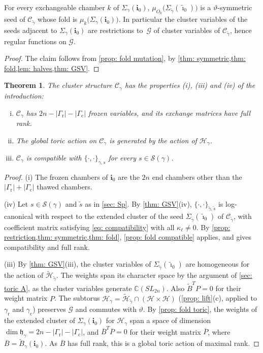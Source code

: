 \documentclass[a4paper]{amsart}
\numberwithin{equation}{section}
\newtheorem{theorem}{Theorem}[section]
\theoremstyle{definition}
\theoremstyle{remark}
\newcommand{\bbC}{\mathbb{C}}
\newcommand{\mfh}{\mathfrak{h}}
\newcommand{\mcG}{\mathcal{G}}
\newcommand{\mcH}{\mathcal{H}}
\newcommand{\mcC}{\mathcal{C}}
\newcommand{\mcS}{\mathcal{S}}
\newcommand{\bfi}{\mathbf{i}}
\newcommand{\tbfi}{\widetilde{\boldsymbol{\imath}}}
\newcommand{\tB}{\widetilde{B}}
\newcommand{\tg}{\widetilde{\gamma}}
\newcommand{\vt}{\vartheta}
\newcommand{\rr}{\mathrm{r}}
\newcommand{\cc}{\mathrm{c}}
\newcommand{\SL}{SL_{2n}}
\begin{document}
\begin{proposition}
  \label{prop: adjacent}
  For every exchangeable chamber $k$ of $\Sigma_\gamma(\bfi_0)$, $\mu_{O_k}\big(\Sigma_{\tg}(\tbfi_0)\big)$ is a $\vt$-symmetric seed of $\mcC_{\tg}$ whose fold is $\mu_k\big(\Sigma_\gamma(\bfi_0)\big)$.
  In particular the cluster variables of the seeds adjacent to $\Sigma_\gamma(\bfi_0)$ are restrictions to~$\mcG$ of cluster variables of $\mcC_{\tg}$, hence regular functions on $\mcG$.
\end{proposition}
\begin{proof}
  The claim follows from \cref{prop: fold mutation}, by \cref{thm: symmetric,thm: fold,lem: halves,thm: GSV}.
\end{proof}

\begin{theorem}
  \label{thm: structure}
  The cluster structure $\mcC_\gamma$ has the properties (i), (iii) and (iv) of the introduction:
  \begin{enumerate}[(i)]
    \item $\mcC_\gamma$ has $2n-|\Gamma_{\rr}|-|\Gamma_{\cc}|$ frozen variables, and its exchange matrices have full rank.
      \setcounter{enumi}{2}
    \item The global toric action on $\mcC_\gamma$ is generated by the action of $\mcH_\gamma$.
    \item $\mcC_\gamma$ is compatible with $\{\cdot,\cdot\}_{\gamma,s}$ for every $s\in\mcS(\gamma)$.
  \end{enumerate}
\end{theorem}
\begin{proof}
  (i) The frozen chambers of $\bfi_0$ are the $2n$ end chambers other than the $|\Gamma_{\rr}|+|\Gamma_{\cc}|$ thawed chambers.

  (iv) Let $s\in\mcS(\gamma)$ and $\widetilde{s}$ as in \cref{sec: Sp}.
  By \cref{thm: GSV}(iv), $\{\cdot,\cdot\}_{\tg,\widetilde{s}}$ is log-canonical with respect to the extended cluster of the seed $\Sigma_{\tg}(\tbfi_0)$ of $\mcC_{\tg}$, with coefficient matrix satisfying \eqref{eq: compatibility} with all $\kappa_\ell\neq0$.
  By \cref{prop: restriction,thm: symmetric,thm: fold}, \cref{prop: fold compatible} applies, and gives compatibility and full rank.

  (iii) By \cref{thm: GSV}(iii), the cluster variables of $\Sigma_{\tg}(\tbfi_0)$ are homogeneous for the action of $\widetilde{\mcH}_{\tg}$.
  The weights span its character space by the argument of \cref{sec: toric A}, as the cluster variables generate $\bbC(\SL)$.
  Also $\tB^TP=0$ for their weight matrix $P$.
  The subtorus $\mcH_\gamma=\widetilde{\mcH}_{\tg}\cap(\mcH\times\mcH)$ (\cref{prop: lift}(c), applied to $\gamma_{\rr}$ and $\gamma_{\cc}$) preserves $\mcG$ and commutes with $\vt$.
  By \cref{prop: fold toric}, the weights of the extended cluster of $\Sigma_\gamma(\bfi_0)$ for $\mcH_\gamma$ span a space of dimension $\dim\mfh_\gamma=2n-|\Gamma_{\rr}|-|\Gamma_{\cc}|$, and $\overline{B}^T\overline{P}=0$ for their weight matrix $\overline{P}$, where $\overline{B}=\tB_\gamma(\bfi_0)$.
  As $\overline{B}$ has full rank, this is a global toric action of maximal rank.
\end{proof}
\end{document}
